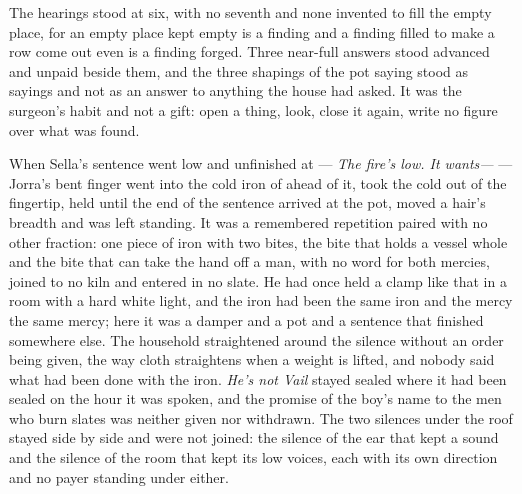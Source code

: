The hearings stood at six, with no seventh and none invented to fill the empty place, for an empty place kept empty is a finding and a finding filled to make a row come out even is a finding forged. Three near-full answers stood advanced and unpaid beside them, and the three shapings of the pot saying stood as sayings and not as an answer to anything the house had asked. It was the surgeon's habit and not a gift: open a thing, look, close it again, write no figure over what was found.

\scenebreak

When Sella's sentence went low and unfinished at  --- \emph{The fire's low. It wants---} --- Jorra's bent finger went into the cold iron of  ahead of it, took the cold out of the fingertip, held until the end of the sentence arrived at the pot, moved a hair's breadth and was left standing. It was a remembered repetition paired with no other fraction: one piece of iron with two bites, the bite that holds a vessel whole and the bite that can take the hand off a man, with no  word for both mercies, joined to no kiln and entered in no slate. He had once held a clamp like that in a room with a hard white light, and the iron had been the same iron and the mercy the same mercy; here it was a damper and a pot and a sentence that finished somewhere else. The household straightened around the silence without an order being given, the way cloth straightens when a weight is lifted, and nobody said what had been done with the iron. \emph{He's not Vail} stayed sealed where it had been sealed on the hour it was spoken, and the promise of the boy's name to the men who burn slates was neither given nor withdrawn. The two silences under the roof stayed side by side and were not joined: the silence of the ear that kept a sound and the silence of the room that kept its low voices, each with its own direction and no payer standing under either.

